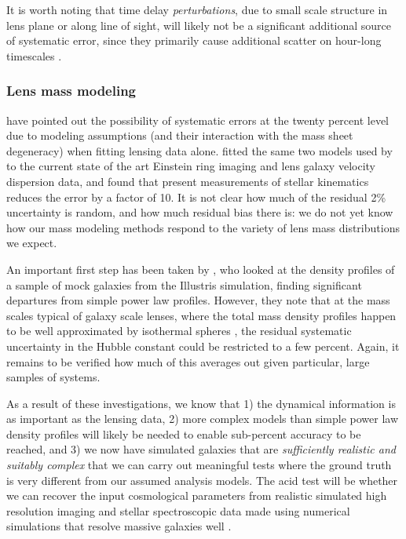 It is worth noting that time delay {\it perturbations},  due to small
scale structure in lens plane or along line of sight, will likely not be
a significant  additional source of systematic error, since they
primarily cause additional scatter on hour-long timescales
\citep{K+M09}.


\subsubsection{Lens mass modeling}

\citet{S+S13} have pointed out the possibility of systematic errors at
the twenty percent level due to modeling assumptions (and their
interaction with the mass sheet degeneracy) when fitting lensing data
alone. \citet{Suy++14} fitted the same two models used by
\citet{S+S13}  to the current state of the art Einstein ring imaging and
lens galaxy velocity dispersion data, and found that present
measurements of stellar kinematics reduces the error by a factor of
10.  It is not clear how much of the residual 2\% uncertainty is
random, and how much residual bias there is: we do not yet know how
our mass modeling methods respond to the variety of lens mass
distributions we expect.

An important first step has been taken by \citet{XuEtal2016}, who
looked at the density profiles of a sample of mock galaxies from the
Illustris simulation, finding significant departures from simple power
law profiles. However, they note that at the mass scales typical of
galaxy scale lenses, where the total mass density profiles happen to
be well approximated by isothermal spheres
\citep{Koo++09,Aug++10}, the residual systematic uncertainty
in the Hubble constant could be restricted to a few percent.
Again, it remains to be verified how much of this averages out
given particular, large samples of systems.

As a result of these investigations, we know that 1) the dynamical
information is as important as the lensing data, 2) more complex
models than simple power law density profiles will likely be needed to
enable sub-percent accuracy to be reached, and 3) we now have
simulated galaxies that are {\it sufficiently realistic and suitably
complex} that we can carry out meaningful tests where the ground truth
is very different from our assumed analysis models. The acid test will
be whether we can recover the input cosmological parameters from
realistic simulated high resolution imaging and stellar spectroscopic
data made using numerical simulations that resolve massive
galaxies well \citep[e.g.,][]{Fia++16}.

